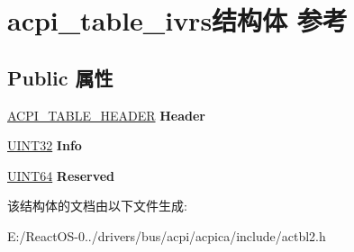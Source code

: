 \hypertarget{structacpi__table__ivrs}{}\section{acpi\+\_\+table\+\_\+ivrs结构体 参考}
\label{structacpi__table__ivrs}
\subsection*{Public 属性}
\begin{DoxyCompactItemize}
\item 
\mbox{\label{structacpi__table__ivrs_ad02e7e3a06d5fecc296af2c0868d1f38}} 
\hyperlink{structacpi__table__header}{A\+C\+P\+I\+\_\+\+T\+A\+B\+L\+E\+\_\+\+H\+E\+A\+D\+ER} {\bfseries Header}
\item 
\mbox{\label{structacpi__table__ivrs_a4f496bc1c4f9b636c7fe584a8d9bb6d3}} 
\hyperlink{_processor_bind_8h_ae1e6edbbc26d6fbc71a90190d0266018}{U\+I\+N\+T32} {\bfseries Info}
\item 
\mbox{\label{structacpi__table__ivrs_a777ffb447702d3745b061b40e8586f47}} 
\hyperlink{_processor_bind_8h_a57be03562867144161c1bfee95ca8f7c}{U\+I\+N\+T64} {\bfseries Reserved}
\end{DoxyCompactItemize}


该结构体的文档由以下文件生成\+:\begin{DoxyCompactItemize}
\item 
E\+:/\+React\+O\+S-\/0../drivers/bus/acpi/acpica/include/actbl2.\+h\end{DoxyCompactItemize}
